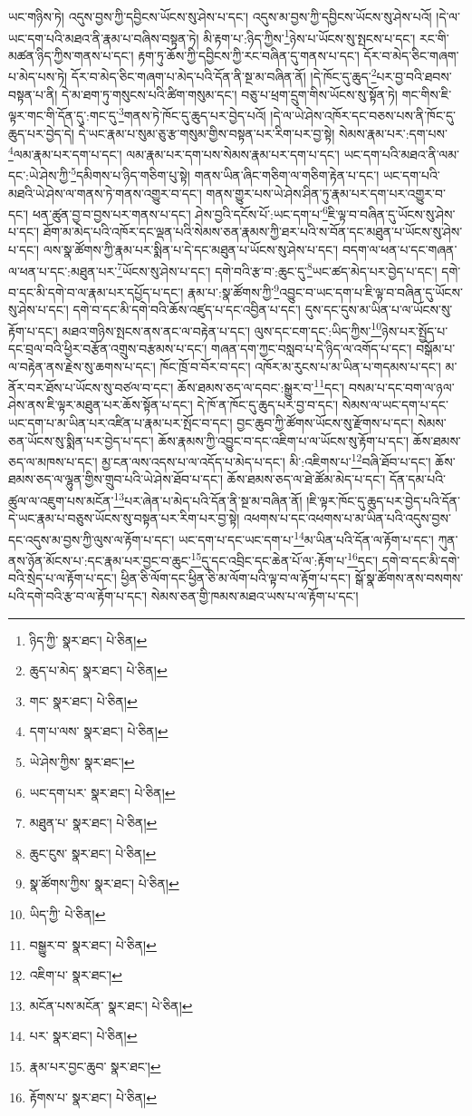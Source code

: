 ཡང་གཉིས་ཏེ། འདུས་བྱས་ཀྱི་དབྱིངས་ཡོངས་སུ་ཤེས་པ་དང་། འདུས་མ་བྱས་ཀྱི་དབྱིངས་ཡོངས་སུ་ཤེས་པའོ། །དེ་ལ་ཡང་དག་པའི་མཐའ་ནི་རྣམ་པ་བཞིས་བསྟན་ཏེ། མི་རྟག་པ་:ཉིད་ཀྱིས་\footnote{ཉིད་ཀྱི་  སྣར་ཐང་།  པེ་ཅིན། }ཉེས་པ་ཡོངས་སུ་སྤངས་པ་དང་། རང་གི་མཚན་ཉིད་ཀྱིས་གནས་པ་དང་། རྟག་ཏུ་ཆོས་ཀྱི་དབྱིངས་ཀྱི་རང་བཞིན་དུ་གནས་པ་དང་། དོར་བ་མེད་ཅིང་གཞག་པ་མེད་པས་ཏེ། དོར་བ་མེད་ཅིང་གཞག་པ་མེད་པའི་དོན་ནི་སྔ་མ་བཞིན་ནོ། །དེ་ཁོང་དུ་ཆུད་\footnote{ཆུད་པ་མེད་  སྣར་ཐང་།  པེ་ཅིན། }པར་བྱ་བའི་ཐབས་བསྟན་པ་ནི། དེ་མ་ཐག་ཏུ་གསུངས་པའི་ཚིག་གསུམ་དང་། བཅུ་པ་ཕྲག་དྲུག་གིས་ཡོངས་སུ་སྟོན་ཏེ། གང་གིས་ཇི་ལྟར་གང་གི་དོན་དུ་:གང་དུ་\footnote{གང་  སྣར་ཐང་།  པེ་ཅིན། }གནས་ཏེ་ཁོང་དུ་ཆུད་པར་བྱེད་པའོ། །དེ་ལ་ཡེ་ཤེས་འཁོར་དང་བཅས་པས་ནི་ཁོང་དུ་ཆུད་པར་བྱེད་དེ། དེ་ཡང་རྣམ་པ་སུམ་ཅུ་རྩ་གསུམ་གྱིས་བསྟན་པར་རིག་པར་བྱ་སྟེ། སེམས་རྣམ་པར་:དག་པས་\footnote{དག་པ་ལས་  སྣར་ཐང་།  པེ་ཅིན། }ལམ་རྣམ་པར་དག་པ་དང་། ལམ་རྣམ་པར་དག་པས་སེམས་རྣམ་པར་དག་པ་དང་། ཡང་དག་པའི་མཐའ་ནི་ལམ་དང་:ཡེ་ཤེས་ཀྱི་\footnote{ཡེ་ཤེས་ཀྱིས་  སྣར་ཐང་། }དམིགས་པ་ཉིད་གཅིག་པུ་སྟེ། གནས་ཡིན་ཞིང་གཅིག་ལ་གཅིག་རྟེན་པ་དང་། ཡང་དག་པའི་མཐའི་ཡེ་ཤེས་ལ་གནས་ཏེ་གནས་འགྱུར་བ་དང་། གནས་གྱུར་པས་ཡེ་ཤེས་ཤིན་ཏུ་རྣམ་པར་དག་པར་འགྱུར་བ་དང་། ཕན་ཚུན་བྱ་བ་བྱས་པར་གནས་པ་དང་། ཤེས་བྱའི་དངོས་པོ་:ཡང་དག་པ་\footnote{ཡང་དག་པར་  སྣར་ཐང་།  པེ་ཅིན། }ཇི་ལྟ་བ་བཞིན་དུ་ཡོངས་སུ་ཤེས་པ་དང་། ཐོག་མ་མེད་པའི་འཁོར་དང་ལྡན་པའི་སེམས་ཅན་རྣམས་ཀྱི་ཐར་པའི་ས་བོན་དང་མཐུན་པ་ཡོངས་སུ་ཤེས་པ་དང་། ལས་སྣ་ཚོགས་ཀྱི་རྣམ་པར་སྨིན་པ་དེ་དང་མཐུན་པ་ཡོངས་སུ་ཤེས་པ་དང་། བདག་ལ་ཕན་པ་དང་གཞན་ལ་ཕན་པ་དང་:མཐུན་པར་\footnote{མཐུན་པ་  སྣར་ཐང་།  པེ་ཅིན། }ཡོངས་སུ་ཤེས་པ་དང་། དགེ་བའི་རྩ་བ་:ཆུང་དུ་\footnote{ཆུང་ངུས་  སྣར་ཐང་།  པེ་ཅིན། }ཡང་ཚད་མེད་པར་བྱེད་པ་དང་། དགེ་བ་དང་མི་དགེ་བ་ལ་རྣམ་པར་དཔྱོད་པ་དང་། རྣམ་པ་:སྣ་ཚོགས་ཀྱི་\footnote{སྣ་ཚོགས་ཀྱིས་  སྣར་ཐང་།  པེ་ཅིན། }འབྱུང་བ་ཡང་དག་པ་ཇི་ལྟ་བ་བཞིན་དུ་ཡོངས་སུ་ཤེས་པ་དང་། དགེ་བ་དང་མི་དགེ་བའི་ཆོས་འཛུད་པ་དང་འབྱིན་པ་དང་། དུས་དང་དུས་མ་ཡིན་པ་ལ་ཡོངས་སུ་རྟོག་པ་དང་། མཐའ་གཉིས་སྤངས་ནས་ནང་ལ་བརྟེན་པ་དང་། ལུས་དང་ངག་དང་:ཡིད་ཀྱིས་\footnote{ཡིད་ཀྱི་  པེ་ཅིན། }ཉེས་པར་སྤྱོད་པ་དང་བྲལ་བའི་ཕྱིར་བརྩོན་འགྲུས་བརྩམས་པ་དང་། གཞན་དག་ཀྱང་བསླབ་པ་དེ་ཉིད་ལ་འགོད་པ་དང་། བསྒོམ་པ་ལ་བརྟེན་ནས་རྗེས་སུ་ཆགས་པ་དང་། ཁོང་ཁྲོ་བ་བོར་བ་དང་། འཁོར་མ་རུངས་པ་མ་ཡིན་པ་གདམས་པ་དང་། མ་ནོར་བར་ཐོས་པ་ཡོངས་སུ་བཙལ་བ་དང་། ཆོས་ཐམས་ཅད་ལ་དབང་:སྒྱུར་བ་\footnote{བསྒྱུར་བ་  སྣར་ཐང་།  པེ་ཅིན། }དང་། བསམ་པ་དང་བག་ལ་ཉལ་ཤེས་ནས་ཇི་ལྟར་མཐུན་པར་ཆོས་སྟོན་པ་དང་། དེ་ཁོ་ན་ཁོང་དུ་ཆུད་པར་བྱ་བ་དང་། སེམས་ལ་ཡང་དག་པ་དང་ཡང་དག་པ་མ་ཡིན་པར་འཛིན་པ་རྣམ་པར་སྤོང་བ་དང་། བྱང་ཆུབ་ཀྱི་ཚོགས་ཡོངས་སུ་རྫོགས་པ་དང་། སེམས་ཅན་ཡོངས་སུ་སྨིན་པར་བྱེད་པ་དང་། ཆོས་རྣམས་ཀྱི་འབྱུང་བ་དང་འཇིག་པ་ལ་ཡོངས་སུ་རྟོག་པ་དང་། ཆོས་ཐམས་ཅད་ལ་མཁས་པ་དང་། མྱ་ངན་ལས་འདས་པ་ལ་འདོད་པ་མེད་པ་དང་། མི་:འཇིགས་པ་\footnote{འཇིག་པ་  སྣར་ཐང་། }བཞི་ཐོབ་པ་དང་། ཆོས་ཐམས་ཅད་ལ་ལྷུན་གྱིས་གྲུབ་པའི་ཡེ་ཤེས་ཐོབ་པ་དང་། ཆོས་ཐམས་ཅད་ལ་ཐེ་ཚོམ་མེད་པ་དང་། དོན་དམ་པའི་ཚུལ་ལ་འཇུག་པས་མངོན་\footnote{མངོན་པས་མངོན་  སྣར་ཐང་།  པེ་ཅིན། }པར་ཞེན་པ་མེད་པའི་དོན་ནི་སྔ་མ་བཞིན་ནོ། །ཇི་ལྟར་ཁོང་དུ་ཆུད་པར་བྱེད་པའི་དོན་དེ་ཡང་རྣམ་པ་བཅུས་ཡོངས་སུ་བསྟན་པར་རིག་པར་བྱ་སྟེ། འཕགས་པ་དང་འཕགས་པ་མ་ཡིན་པའི་འདུས་བྱས་དང་འདུས་མ་བྱས་ཀྱི་ལུས་ལ་རྟོག་པ་དང་། ཡང་དག་པ་དང་ཡང་དག་པ་\footnote{པར་  སྣར་ཐང་།  པེ་ཅིན། }མ་ཡིན་པའི་དོན་ལ་རྟོག་པ་དང་། ཀུན་ནས་ཉོན་མོངས་པ་:དང་རྣམ་པར་བྱང་བ་ཆུང་\footnote{རྣམ་པར་བྱང་ཆུབ་  སྣར་ཐང་། }དུ་དང་འབྲིང་དང་ཆེན་པོ་ལ་:རྟོག་པ་\footnote{རྟོགས་པ་  སྣར་ཐང་།  པེ་ཅིན། }དང་། དགེ་བ་དང་མི་དགེ་བའི་སྲེད་པ་ལ་རྟོག་པ་དང་། ཕྱིན་ཅི་ལོག་དང་ཕྱིན་ཅི་མ་ལོག་པའི་ལྟ་བ་ལ་རྟོག་པ་དང་། སྒོ་སྣ་ཚོགས་ནས་བསགས་པའི་དགེ་བའི་རྩ་བ་ལ་རྟོག་པ་དང་། སེམས་ཅན་གྱི་ཁམས་མཐའ་ཡས་པ་ལ་རྟོག་པ་དང་། 